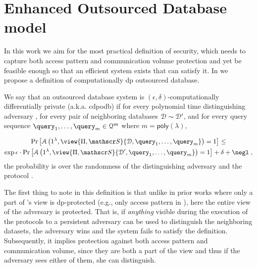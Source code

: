 	\section{Enhanced Outsourced Database model}

		In this work we aim for the most practical definition of security, which needs to capture both access pattern and communication volume protection and yet be feasible enough so that an efficient system exists that can satisfy it.
		In \epsolute{} \cite{epsolute} we propose a definition of computationally \acrshort{dp} outsourced database.

		\begin{definition}\label{definition:cdpodb}
			We say that an outsourced database system \protocol{} is $(\epsilon, \delta)$-computationally differentially private (a.k.a. \acrshort{cdpodb}) if for every polynomial time distinguishing adversary \adversary{}, for every pair of neighboring databases $\mathcal{D} \sim \mathcal{D}^\prime$, and for every query sequence $\fromNtoM{\query}{1}{m} \in \querySet^m$ where $m = \mathsf{poly}(\lambda)$,

			\begin{multline*}
				\probability{\adversary \left( 1^\lambda, \view{\protocol, \server}{\database, \fromNtoM{\query}{1}{m}} \right) = 1 } \leq \\
				\exp{\epsilon} \cdot \probability{\adversary \left( 1^\lambda, \view{\protocol ,\server}{\database^\prime, \fromNtoM{\query}{1}{m}} \right) = 1} + \delta + \negl \; ,
			\end{multline*}
			the probability is over the randomness of the distinguishing adversary \adversary{} and the protocol \protocol{}.
		\end{definition}

		The first thing to note in this definition is that unlike in prior works where only a part of \adversary{}'s view is \acrshort{dp}-protected (e.g., only access pattern in \cite{differential-obliviousness,differential-obliviousness-followup}), here the entire view of the adversary is protected.
		That is, if \emph{anything} visible during the execution of the protocols to a persistent adversary can be used to distinguish the neighboring datasets, the adversary wins and the system fails to satisfy the definition.
		Subsequently, it implies protection against both access pattern and communication volume, since they are both a part of the view and thus if the adversary sees either of them, she can distinguish.

